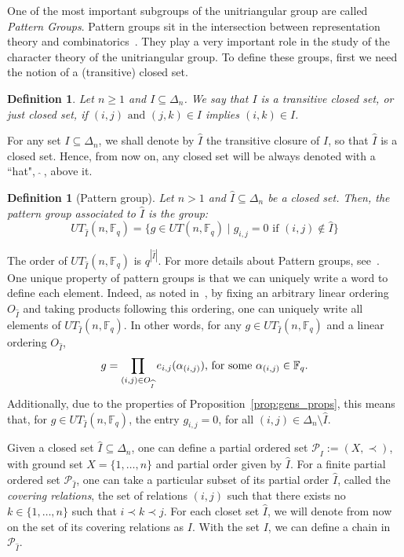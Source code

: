 \documentclass[11pt,letterpaper]{amsart}
\newtheorem{definition}[theorem]{Definition}
\newcommand{\PP}{\mathcal{P}}
\newcommand{\FF}{\mathbb{F}}
\begin{document}
One of the most important subgroups of the unitriangular group are called \emph{Pattern Groups}. Pattern groups sit in the intersection between representation theory and combinatorics~\cite{Dipper2017,Diaconis2009}. They play a very important role in the study of the character theory of the unitriangular group. To define these groups, first we need the notion of a (transitive) closed set. 
\begin{definition}\label{def:closure}
    Let $n\geq 1$ and $I\subseteq \Delta_n$. We say that $I$ is a \emph{transitive closed set}, or just \emph{closed set}, if $(i,j)\text{ and }(j,k)\in I$ implies $(i,k)\in I$.
\end{definition}

 For any set $I\subseteq  \Delta_n$, we shall denote by $\widehat{I}$ the transitive closure of $I$, so that $\widehat{I}$ is a closed set.
 Hence, from now on, any closed set will be always denoted with a ``hat", $\ \widehat{ }\ $, above it.

\begin{definition}[Pattern group]
    Let $n>1$ and $\widehat{I}\subseteq \Delta_n$ be a closed set. Then, the \emph{pattern group} associated to $\widehat{I}$ is the group:
    $$UT_{\widehat{I}}(n,\FF_q)=\{g\in UT(n,\FF_q)\mid g_{i,j}=0\text{ if }(i,j)\notin \widehat{I}\}$$
\end{definition}

The order of $UT_{\widehat{I}}(n,\FF_q)$ is $q^{|\widehat{I}|}$. For more details about Pattern groups, see~\cite{Diaconis2009}.
One unique property of pattern groups is that we can uniquely write a word to define each element. 
Indeed, as noted in~\cite{Dipper2017}, by fixing an arbitrary linear ordering $O_{\widehat{I}}$ and taking products following this ordering, one can uniquely write all elements of $UT_{\widehat{I}}(n,\FF_q)$. In other words, for any $g\in UT_{\widehat{I}}(n,\FF_q)$ and a linear ordering $O_{\widehat{I}}$,
$$ g = \prod_{(i,j)\in O_{\widehat{I}}}e_{i,j}(\alpha_{(i,j)})
\textnormal{, for some } \alpha_{(i,j)}\in \FF_q.$$
Additionally, due to the properties of Proposition~\ref{prop:gens_props}, this means that, for $g\in UT_{\widehat{I}}(n,\FF_q)$, the entry $g_{i,j} = 0$, for all $(i,j)\in \Delta_n\setminus  \widehat{I}$.

Given a closed set $\widehat{I}\subseteq\Delta_n$, one can define a partial ordered set $\PP_{\widehat{I}}:=(X,\prec)$, with ground set $X=\{1,\ldots,n\}$ and partial order given by $ \widehat{I}$.
For a finite partial ordered set $\PP_{\widehat{I}}$, one can take a particular subset of its partial order $\widehat{I}$, called the \emph{covering relations}, the set of relations $(i,j)$ such that there exists no $k\in\{1,\ldots,n\}$ such that $i\prec k\prec j$. For each closet set $\widehat{I}$, we will denote from now on the set of its covering relations as $I$.
With the set $I$, we can define a chain in $\PP_{\widehat{I}}$.
\end{document}
